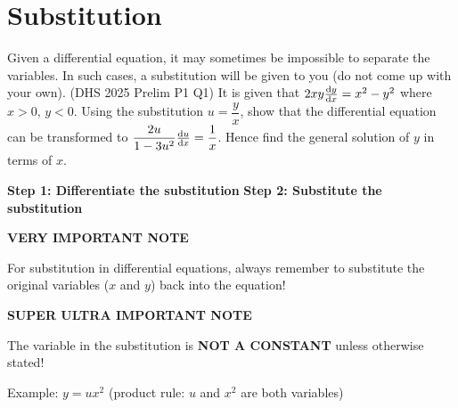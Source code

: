 \section{Substitution}
Given a differential equation, it may sometimes be impossible to separate the variables. In such cases, a substitution will be given to you (do not come up with your own).
\exlab
{\small (DHS 2025 Prelim P1 Q1)} It is given that $2xy\frac{\mathrm{d}y}{\mathrm{d}x}=x^{2}-y^{2}$ where $x>0$, $y<0$. Using the substitution $u=\dfrac{y}{x}$, show that the differential equation can be transformed to $\dfrac{2u}{1-3u^{2}}\frac{\mathrm{d}u}{\mathrm{d}x}=\dfrac{1}{x}$. Hence find the general solution of $y$ in terms of $x$.\par\medskip
\noindent\textbf{Step 1: Differentiate the substitution}
\noindent\textbf{Step 2: Substitute the substitution}
\begin{caution}
\textbf{\large VERY IMPORTANT NOTE}\par\smallskip
For substitution in differential equations, always remember to substitute the original variables ($x$ and $y$) back into the equation!
\end{caution}
\begin{caution}
\textbf{\large SUPER ULTRA IMPORTANT NOTE}\par\smallskip
The variable in the substitution is \textbf{NOT A CONSTANT} unless otherwise stated!\par\smallskip
Example: $y=ux^{2}$ (product rule: $u$ and $x^{2}$ are both variables)
\end{caution}
